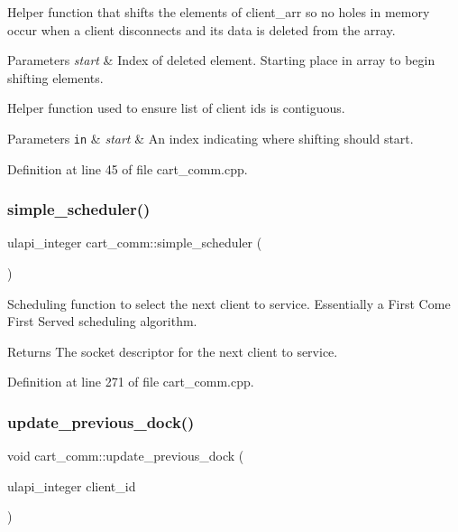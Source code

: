 Helper function that shifts the elements of client\+\_\+arr so no holes in memory occur when a client disconnects and its data is deleted from the array. 
\begin{DoxyParams}{Parameters}
{\em start} & Index of deleted element. Starting place in array to begin shifting elements.\\
\hline
\end{DoxyParams}
Helper function used to ensure list of client ids is contiguous. 
\begin{DoxyParams}[1]{Parameters}
\mbox{\tt in}  & {\em start} & An index indicating where shifting should start. \\
\hline
\end{DoxyParams}


Definition at line 45 of file cart\+\_\+comm.\+cpp.

\mbox{\label{classcart__comm_acea9c1ef1278323dd0e387b34c5c8015}} 
\subsubsection{\texorpdfstring{simple\+\_\+scheduler()}{simple\_scheduler()}}
{\footnotesize\ttfamily ulapi\+\_\+integer cart\+\_\+comm\+::simple\+\_\+scheduler (\begin{DoxyParamCaption}{ }\end{DoxyParamCaption})}

Scheduling function to select the next client to service. Essentially a First Come First Served scheduling algorithm. \begin{DoxyReturn}{Returns}
The socket descriptor for the next client to service. 
\end{DoxyReturn}


Definition at line 271 of file cart\+\_\+comm.\+cpp.

\mbox{\label{classcart__comm_a90f2c5d14510aabfa28439a05e5bebb6}} 
\subsubsection{\texorpdfstring{update\+\_\+previous\+\_\+dock()}{update\_previous\_dock()}}
{\footnotesize\ttfamily void cart\+\_\+comm\+::update\+\_\+previous\+\_\+dock (\begin{DoxyParamCaption}\item[{ulapi\+\_\+integer}]{client\+\_\+id }\end{DoxyParamCaption})}

